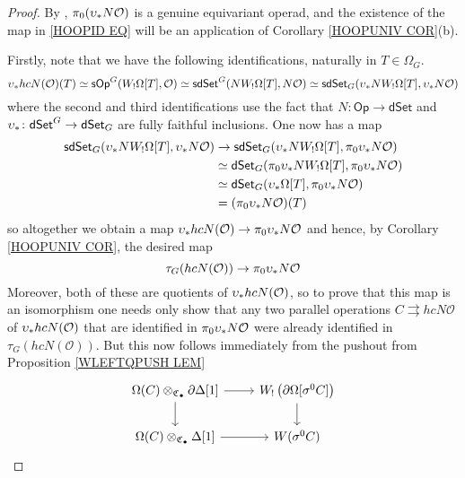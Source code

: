 \documentclass[a4paper,10pt
,draft
]{article}%
\numberwithin{equation}{section}
\numberwithin{figure}{section}
\theoremstyle{definition} %
\newcommand{\dSet}{\mathsf{dSet}}
\renewcommand{\O}{\ensuremath{\mathcal O}}
\newcommand{\1}{\ensuremath{\mathbbm 1}}%
\begin{document}
\begin{proof}
      By \cite[Prop. 5.9]{BP_edss}, $\pi_0(\upsilon_{\**}N\O)$ is a genuine equivariant operad,
      and the existence of the map in \eqref{HOOPID EQ}
      will be an application of
      Corollary \ref{HOOPUNIV COR}(b).

Firstly,
note that we have the following identifications,
naturally in $T \in \Omega_G$.
\[
\upsilon_{\**}hcN(\O)(T)
\simeq
\mathsf{sOp}^G(W_!\Omega[T],\O)
\simeq
\mathsf{sdSet}^G(N W_!\Omega[T],N \O)
\simeq 
\mathsf{sdSet}_G(\upsilon_{\**}N W_!\Omega[T],\upsilon_{\**}N \O)
\]
where the second and third identifications use the fact that 
$N\colon \mathsf{Op} \to \mathsf{dSet}$ and $\upsilon_{\**} \colon \dSet^G \to \dSet_G$
are fully faithful inclusions. 
One now has a map
\begin{align*}
  \mathsf{sdSet}_G(\upsilon_{\**}N W_!\Omega[T],\upsilon_{\**}N \O)
  & \to
    \mathsf{sdSet}_G(\upsilon_{\**}N W_!\Omega[T],\pi_0\upsilon_{\**}N \O)
  \\ & \simeq
       \mathsf{dSet}_G(\pi_0 \upsilon_{\**}  N W_!\Omega[T],\pi_0\upsilon_{\**}N \O)
  \\ & \simeq
       \mathsf{dSet}_G(\upsilon_{\**}\Omega[T],\pi_0\upsilon_{\**}N \O)
  \\ & =
       (\pi_0\upsilon_{\**}N \O)(T)
\end{align*}
so altogether we obtain a map
$\upsilon_{\**}hcN(\O) \to \pi_0 \upsilon_{\**} N \O$
and hence, by Corollary \ref{HOOPUNIV COR},
the desired map 
\[
	\tau_G(hcN(\O)) \to \pi_0 \upsilon_{\**} N \O
\]
Moreover, both of these are quotients of $\upsilon_{\**}hcN(\O)$,
so to prove that this map is an isomorphism one needs only show that any two parallel operations $C \rightrightarrows hcN \O$ of $\upsilon_{\**}hcN(\O)$
that are identified in 
$\pi_0 \upsilon_{\**} N \O$
were already identified in 
$\tau_G(hcN(\O))$.
But this now follows immediately from the pushout from Proposition \ref{WLEFTQPUSH LEM}
\[
\begin{tikzcd}
	\Omega(C) \otimes_{\mathfrak{C}_{\bullet}}
	\partial \Delta[1]
	\ar{r} \ar{d}
&
	W_! \left(\partial \Omega[\sigma^0 C]\right) 
	\ar{d}
\\
	\Omega(C) \otimes_{\mathfrak{C}_{\bullet}}
	\Delta[1]
	\ar{r}
&
	W(\sigma^0 C)
\end{tikzcd}
\]
\end{proof}










{}

\end{document}
